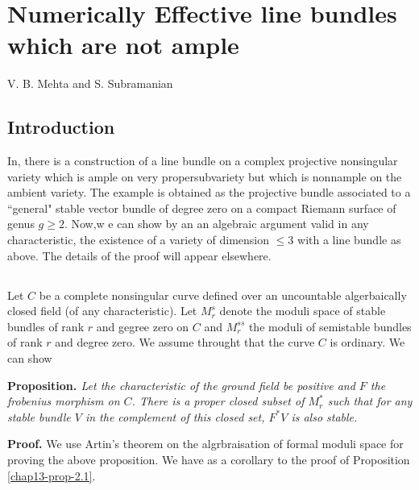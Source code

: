 \chapter{Numerically Effective line bundles which are not ample}\label{chap13}


\begin{center}
V. B. Mehta and S. Subramanian
\end{center}

\setcounter{pageoriginal}{268}
\section{Introduction}\label{chap13-sec-1}
In\pageoriginale \cite{chap13-key6}, there is a construction of a line bundle on a complex projective nonsingular variety which is ample on very propersubvariety but which is nonnample on the ambient variety. The example is obtained as the projective bundle associated to a ``general" stable vector bundle of degree zero on a compact Riemann surface of genus $g \geq 2$. Now,w e can show by an an algebraic argument valid in any characteristic, the existence of a variety of dimension $\leq 3$ with a line bundle as above. The details of the proof will appear elsewhere.

\section{}\label{chap13-sec-2}
Let $C$ be a complete  nonsingular curve defined over an uncountable algerbaically closed field (of any characteristic). Let $M_{r}^{s}$ denote the moduli space of stable bundles of rank $r$ and gegree zero on $C$ and $M_{r}^{ss}$ the moduli of semistable bundles of rank $r$ and degree zero. We assume throught that the curve $C$ is ordinary. We can show

\medskip
\noindent
{\bfseries {} Proposition. \label{chap13-prop-2.1}} \textit{Let the characteristic of the ground field be positive and $F$ the frobenius morphism on $C$. There is a proper closed subset of $M_{r}^{*}$ such that for any stable bundle $V$ in the complement of this closed set, $F^{*}V$ is also stable.}

\medskip
\noindent
{\bfseries Proof.} We use Artin's theorem on the algrbraisation of formal moduli space for proving the above proposition. We have as a corollary to the proof of Proposition \eqref{chap13-prop-2.1}.

